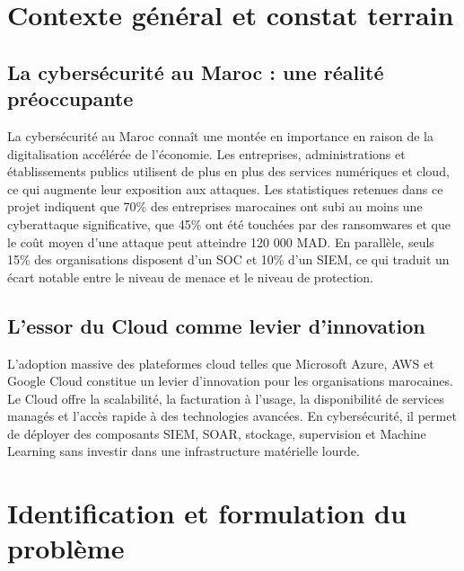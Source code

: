 \documentclass[11pt,a4paper]{report}
\begin{document}
\section{Contexte général et constat terrain}
\subsection{La cybersécurité au Maroc : une réalité préoccupante}
La cybersécurité au Maroc connaît une montée en importance en raison de la digitalisation accélérée de l'économie. Les entreprises, administrations et établissements publics utilisent de plus en plus des services numériques et cloud, ce qui augmente leur exposition aux attaques. Les statistiques retenues dans ce projet indiquent que 70\% des entreprises marocaines ont subi au moins une cyberattaque significative, que 45\% ont été touchées par des ransomwares et que le coût moyen d'une attaque peut atteindre 120 000 MAD. En parallèle, seuls 15\% des organisations disposent d'un SOC et 10\% d'un SIEM, ce qui traduit un écart notable entre le niveau de menace et le niveau de protection.

\subsection{L'essor du Cloud comme levier d'innovation}
L'adoption massive des plateformes cloud telles que Microsoft Azure, AWS et Google Cloud constitue un levier d'innovation pour les organisations marocaines. Le Cloud offre la scalabilité, la facturation à l'usage, la disponibilité de services managés et l'accès rapide à des technologies avancées. En cybersécurité, il permet de déployer des composants SIEM, SOAR, stockage, supervision et Machine Learning sans investir dans une infrastructure matérielle lourde.

\section{Identification et formulation du problème}
\end{document}
